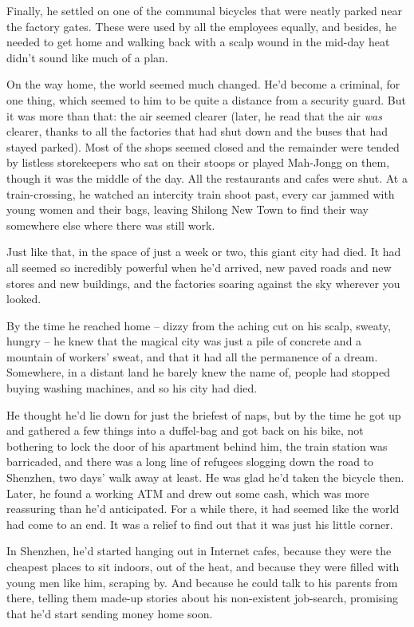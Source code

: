 Finally, he settled on one of the communal bicycles that were
neatly parked near the factory gates. These were used by all the
employees equally, and besides, he needed to get home and walking
back with a scalp wound in the mid-day heat didn't sound like much
of a plan.

On the way home, the world seemed much changed. He'd become a
criminal, for one thing, which seemed to him to be quite a distance
from a security guard. But it was more than that: the air seemed
clearer (later, he read that the air \emph{was} clearer, thanks to
all the factories that had shut down and the buses that had stayed
parked). Most of the shops seemed closed and the remainder were
tended by listless storekeepers who sat on their stoops or played
Mah-Jongg on them, though it was the middle of the day. All the
restaurants and cafes were shut. At a train-crossing, he watched an
intercity train shoot past, every car jammed with young women and
their bags, leaving Shilong New Town to find their way somewhere
else where there was still work.

Just like that, in the space of just a week or two, this giant city
had died. It had all seemed so incredibly powerful when he'd
arrived, new paved roads and new stores and new buildings, and the
factories soaring against the sky wherever you looked.

By the time he reached home -- dizzy from the aching cut on his
scalp, sweaty, hungry -- he knew that the magical city was just a
pile of concrete and a mountain of workers' sweat, and that it had
all the permanence of a dream. Somewhere, in a distant land he
barely knew the name of, people had stopped buying washing
machines, and so his city had died.

He thought he'd lie down for just the briefest of naps, but by the
time he got up and gathered a few things into a duffel-bag and got
back on his bike, not bothering to lock the door of his apartment
behind him, the train station was barricaded, and there was a long
line of refugees slogging down the road to Shenzhen, two days' walk
away at least. He was glad he'd taken the bicycle then. Later, he
found a working ATM and drew out some cash, which was more
reassuring than he'd anticipated. For a while there, it had seemed
like the world had come to an end. It was a relief to find out that
it was just his little corner.

In Shenzhen, he'd started hanging out in Internet cafes, because
they were the cheapest places to sit indoors, out of the heat, and
because they were filled with young men like him, scraping by. And
because he could talk to his parents from there, telling them
made-up stories about his non-existent job-search, promising that
he'd start sending money home soon.

